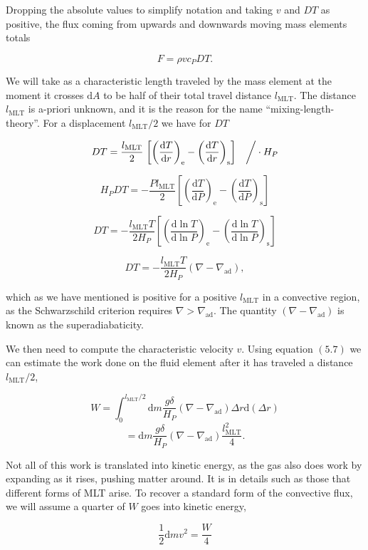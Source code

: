 \documentclass[twocolumn]{article}
\begin{document}
Dropping the absolute values to simplify notation and taking \(v\) and
\(DT\) as positive, the flux coming from upwards and downwards moving
mass elements totals

\[F=\rho v c_P DT.\tag{5.9}\]

We will take as a characteristic length traveled by the mass element at
the moment it crosses \(\mathrm{d}A\) to be half of their total travel
distance \(l_\mathrm{MLT}\). The distance \(l_\mathrm{MLT}\) is a-priori
unknown, and it is the reason for the name ``mixing-length-theory''. For
a displacement \(l_\mathrm{MLT}/2\) we have for \(DT\)

\[DT=\frac{l_\mathrm{MLT}}{2}\left.\left[\left(\frac{\mathrm{d}T}{\mathrm{d}r}\right)_\mathrm{e}-\left(\frac{\mathrm{d}T}{\mathrm{d}r}\right)_\mathrm{s}\right]\quad\right/\cdot H_P\]

\[H_P DT = -\frac{Pl_\mathrm{MLT}}{2}\left[\left(\frac{\mathrm{d}T}{\mathrm{d}P}\right)_\mathrm{e}-\left(\frac{\mathrm{d}T}{\mathrm{d}P}\right)_\mathrm{s}\right]\]

\[DT=-\frac{l_\mathrm{MLT}T}{2H_P}\left[\left(\frac{\mathrm{d}\ln T}{\mathrm{d}\ln P}\right)_\mathrm{e}-\left(\frac{\mathrm{d}\ln T}{\mathrm{d}\ln P}\right)_\mathrm{s}\right]\]

\[DT = -\frac{l_\mathrm{MLT}T}{2H_P}(\nabla-\nabla_\mathrm{ad}),\tag{5.10}\]

which as we have mentioned is positive for a positive \(l_\mathrm{MLT}\)
in a convective region, as the Schwarzschild criterion requires
\(\nabla>\nabla_\mathrm{ad}\). The quantity
\((\nabla-\nabla_\mathrm{ad})\) is known as the superadiabaticity.

We then need to compute the characteristic velocity \(v\). Using
equation \((5.7)\) we can estimate the work done on the fluid element
after it has traveled a distance \(l_\mathrm{MLT}/2\),

\[W=\int_0^{l_\mathrm{MLT}/2}\mathrm{d}m\frac{g\delta}{H_P}(\nabla-\nabla_\mathrm{ad})\Delta r\mathrm{d}(\Delta r)\]
\[= \mathrm{d}m\frac{g\delta}{H_P}(\nabla-\nabla_\mathrm{ad})\frac{l_\mathrm{MLT}^2}{4}.\]

Not all of this work is translated into kinetic energy, as the gas also
does work by expanding as it rises, pushing matter around. It is in
details such as those that different forms of MLT arise. To recover a
standard form of the convective flux, we will assume a quarter of \(W\)
goes into kinetic energy,

\[\frac{1}{2}\mathrm{d}m v^2 = \frac{W}{4}\]
\end{document}
